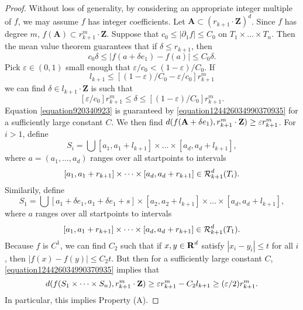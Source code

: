 \begin{proof}
    Without loss of generality, by considering an appropriate integer multiple of $f$, we may assume $f$ has integer coefficients. Let $\mathbf{A} \subset (r_{k+1} \cdot \mathbf{Z})^d$. Since $f$ has degree $m$, $f(\mathbf{A}) \subset r_{k+1}^m \cdot \mathbf{Z}$. Suppose that $c_0 \leq |\partial_1 f| \leq C_0$ on $T_1 \times \dots \times T_n$. Then the mean value theorem guarantees that if $\delta \leq r_{k+1}$, then
    \[ c_0 \delta \leq |f(a + \delta e_1) - f(a)| \leq C_0 \delta. \]
    Pick $\varepsilon \in (0,1)$ small enough that $\varepsilon/c_0 < (1 - \varepsilon)/C_0$. If
    \begin{equation} \label{equation920340923}
        l_{k+1} \leq [(1-\varepsilon)/C_0 - \varepsilon/c_0] r_{k+1}^m
    \end{equation}
    we can find $\delta \in l_{k+1} \cdot \mathbf{Z}$ is such that
    \[ [\varepsilon/c_0] r_{k+1}^m \leq \delta \leq [(1 - \varepsilon)/C_0] r_{k+1}^m. \]
    Equation \eqref{equation920340923} is guaranteed by \eqref{equation124426034990370935} for a sufficiently large constant $C$. We then find $d(f(\mathbf{A} + \delta e_1), r_{k+1}^m \cdot \operatorname{\mathbf{Z}}) \geq \varepsilon r_{k+1}^m$. For $i > 1$, define
    \[ S_i = \bigcup [a_1, a_1 + l_{k+1}] \times \dots \times [a_d, a_d + l_{k+1}], \]
    where $a = (a_1, \dots, a_d)$ ranges over all startpoints to intervals
    \[ [a_1,a_1 + r_{k+1}] \times \dots \times [a_d,a_d + r_{k+1}] \in \operatorname{\mathcal{R}}_{k+1}^d(T_i). \]
    Similarily, define
    \[ S_1 = \bigcup [a_1 + \delta e_1, a_1 + \delta e_1 + s] \times [a_2, a_2 + l_{k+1}] \times \dots \times [a_d, a_d + l_{k+1}], \]
    where $a$ ranges over all startpoints to intervals
    \[ [a_1,a_1 + r_{k+1}] \times \dots \times [a_d,a_d + r_{k+1}] \in \operatorname{\mathcal{R}}_{k+1}^d(T_1). \]
    Because $f$ is $C^1$, we can find $C_2$ such that if $x, y \in \operatorname{\mathbf{R}}^d$ satisfy $|x_i - y_i| \leq t$ for all $i$, then $|f(x) - f(y)| \leq C_2 t$. But then for a sufficiently large constant $C$, \eqref{equation124426034990370935} implies that
    \[ d(f(S_1 \times \dots \times S_n), r_{k+1}^m \cdot \operatorname{\mathbf{Z}}) \geq \varepsilon r_{k+1}^m - C_2 l_{k+1} \geq (\varepsilon/2) r_{k+1}^m. \]
    In particular, this implies Property (A).
\end{proof}

